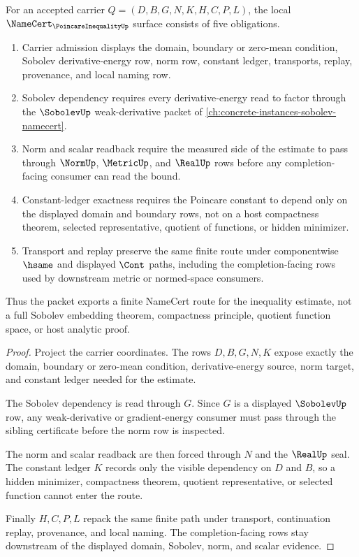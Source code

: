 \begin{theorem}
\label{thm:poincare-inequality-namecert-obligations}
For an accepted carrier $Q=(D,B,G,N,K,H,C,P,L)$, the local $\NameCert_{\PoincareInequalityUp}$ surface consists of five obligations.
\begin{enumerate}
\item Carrier admission displays the domain, boundary or zero-mean condition, Sobolev derivative-energy row, norm row, constant ledger, transports, replay, provenance, and local naming row.
\item Sobolev dependency requires every derivative-energy read to factor through the $\SobolevUp$ weak-derivative packet of \autoref{ch:concrete-instances-sobolev-namecert}.
\item Norm and scalar readback require the measured side of the estimate to pass through $\NormUp$, $\MetricUp$, and $\RealUp$ rows before any completion-facing consumer can read the bound.
\item Constant-ledger exactness requires the Poincare constant to depend only on the displayed domain and boundary rows, not on a host compactness theorem, selected representative, quotient of functions, or hidden minimizer.
\item Transport and replay preserve the same finite route under componentwise $\hsame$ and displayed $\Cont$ paths, including the completion-facing rows used by downstream metric or normed-space consumers.
\end{enumerate}
Thus the packet exports a finite NameCert route for the inequality estimate, not a full Sobolev embedding theorem, compactness principle, quotient function space, or host analytic proof.
\end{theorem}
\begin{proof}
Project the carrier coordinates. The rows $D,B,G,N,K$ expose exactly the domain, boundary or zero-mean condition, derivative-energy source, norm target, and constant ledger needed for the estimate.

The Sobolev dependency is read through $G$. Since $G$ is a displayed $\SobolevUp$ row, any weak-derivative or gradient-energy consumer must pass through the sibling certificate before the norm row is inspected.

The norm and scalar readback are then forced through $N$ and the $\RealUp$ seal. The constant ledger $K$ records only the visible dependency on $D$ and $B$, so a hidden minimizer, compactness theorem, quotient representative, or selected function cannot enter the route.

Finally $H,C,P,L$ repack the same finite path under transport, continuation replay, provenance, and local naming. The completion-facing rows stay downstream of the displayed domain, Sobolev, norm, and scalar evidence.
\end{proof}

